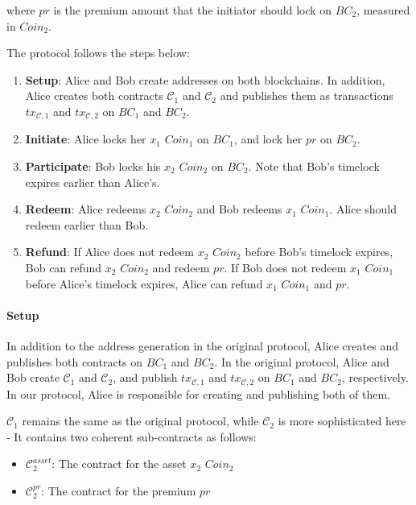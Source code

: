 where $pr$ is the premium amount that the initiator should lock on $BC_2$, measured in $Coin_2$.

The protocol follows the steps below:

\begin{enumerate}
    \item \textbf{Setup}: Alice and Bob create addresses on both blockchains.
    In addition, Alice creates both contracts $\mathcal{C}_1$ and $\mathcal{C}_2$ and publishes them as transactions $tx_{\mathcal{C}, 1}$ and $tx_{\mathcal{C}, 2}$ on $BC_1$ and $BC_2$. 
    \item \textbf{Initiate}: Alice locks her $x_1$ $Coin_1$ on $BC_1$, and lock her $pr$ on $BC_2$.
    \item \textbf{Participate}: Bob locks his $x_2$ $Coin_2$ on $BC_2$. Note that Bob's timelock expires earlier than Alice's.
    \item \textbf{Redeem}: Alice redeems $x_2$ $Coin_2$ and Bob redeems $x_1$ $Coin_1$. Alice should redeem earlier than Bob.
    \item \textbf{Refund}: If Alice does not redeem $x_2$ $Coin_2$ before Bob's timelock expires, Bob can refund $x_2$ $Coin_2$ and redeem $pr$.
    If Bob does not redeem $x_1$ $Coin_1$ before Alice's timelock expires, Alice can refund $x_1$ $Coin_1$ and $pr$.
\end{enumerate}

\paragraph{Setup}
In addition to the address generation in the original protocol,
Alice creates and publishes both contracts on $BC_1$ and $BC_2$.
In the original protocol, Alice and Bob create $\mathcal{C}_1$ and $\mathcal{C}_2$, and publish $tx_{\mathcal{C}, 1}$ and $tx_{\mathcal{C}, 2}$ on $BC_1$ and $BC_2$, respectively.
In our protocol, Alice is responsible for creating and publishing both of them.

$\mathcal{C}_1$ remains the same as the original protocol, while $\mathcal{C}_2$ is more sophisticated here - It contains two coherent sub-contracts as follows:

\begin{itemize}
    \item $\mathcal{C}^{asset}_2$: The contract for the asset $x_2$ $Coin_2$
    \item $\mathcal{C}^{pr}_2$: The contract for the premium $pr$
\end{itemize}

